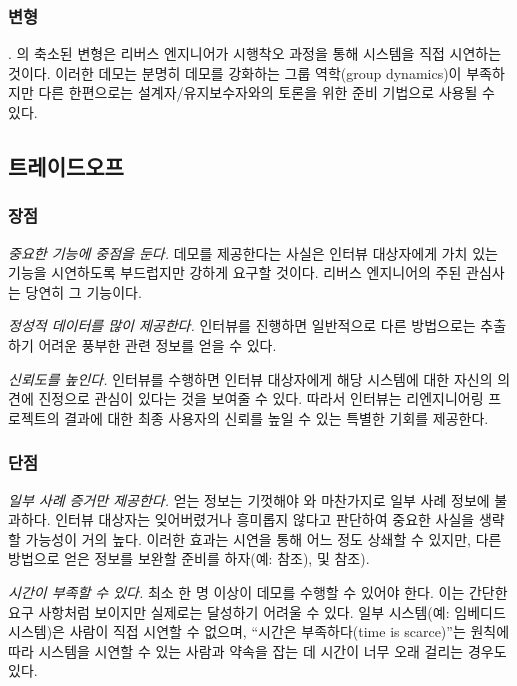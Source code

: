 \documentclass[a4paper,10pt,twoside]{book}
\begin{document}
\subsubsection*{변형}

.
의 축소된 변형은 리버스 엔지니어가 시행착오 과정을 통해 시스템을 직접 시연하는 것이다. 이러한 데모는 분명히 데모를 강화하는 그룹 역학(group dynamics)이 부족하지만 다른 한편으로는 설계자/유지보수자와의 토론을 위한 준비 기법으로 사용될 수 있다.

\subsection*{트레이드오프}

\subsubsection*{장점}

\begin{bulletlist}
  \item \emph{중요한 기능에 중점을 둔다.}
데모를 제공한다는 사실은 인터뷰 대상자에게 가치 있는 기능을 시연하도록 부드럽지만 강하게 요구할 것이다. 리버스 엔지니어의 주된 관심사는 당연히 그 기능이다.

  \item \emph{정성적 데이터를 많이 제공한다.}
인터뷰를 진행하면 일반적으로 다른 방법으로는 추출하기 어려운 풍부한 관련 정보를 얻을 수 있다. 

  \item \emph{신뢰도를 높인다.}
인터뷰를 수행하면 인터뷰 대상자에게 해당 시스템에 대한 자신의 의견에 진정으로 관심이 있다는 것을 보여줄 수 있다. 따라서 인터뷰는 리엔지니어링 프로젝트의 결과에 대한 최종 사용자의 신뢰를 높일 수 있는 특별한 기회를 제공한다.
\end{bulletlist}

\subsubsection*{단점}

\begin{bulletlist}
  \item \emph{일부 사례 증거만 제공한다.}
얻는 정보는 기껏해야 와 마찬가지로 일부 사례 정보에 불과하다. 인터뷰 대상자는 잊어버렸거나 흥미롭지 않다고 판단하여 중요한 사실을 생략할 가능성이 거의 높다. 이러한 효과는 시연을 통해 어느 정도 상쇄할 수 있지만, 다른 방법으로 얻은 정보를 보완할 준비를 하자(예:  참조),  및  참조).

  \item \emph{시간이 부족할 수 있다.}
최소 한 명 이상이 데모를 수행할 수 있어야 한다. 이는 간단한 요구 사항처럼 보이지만 실제로는 달성하기 어려울 수 있다. 일부 시스템(예: 임베디드 시스템)은 사람이 직접 시연할 수 없으며, ``시간은 부족하다(time is scarce)''는 원칙에 따라 시스템을 시연할 수 있는 사람과 약속을 잡는 데 시간이 너무 오래 걸리는 경우도 있다.
\end{bulletlist}
\end{document}
